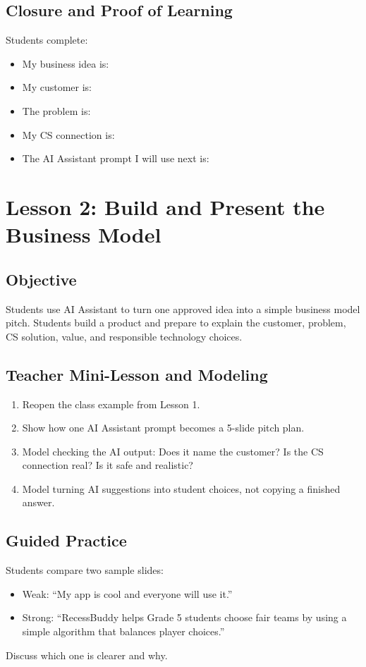 \documentclass[11pt]{article}
\begin{document}
\subsection{Closure and Proof of Learning}
Students complete:
\begin{itemize}
  \item My business idea is:
  \item My customer is:
  \item The problem is:
  \item My CS connection is:
  \item The AI Assistant prompt I will use next is:
\end{itemize}

\section{Lesson 2: Build and Present the Business Model}
\subsection{Objective}
Students use AI Assistant to turn one approved idea into a simple business model pitch. Students build a product and prepare to explain the customer, problem, CS solution, value, and responsible technology choices.

\subsection{Teacher Mini-Lesson and Modeling}
\begin{enumerate}
  \item Reopen the class example from Lesson 1.
  \item Show how one AI Assistant prompt becomes a 5-slide pitch plan.
  \item Model checking the AI output: Does it name the customer? Is the CS connection real? Is it safe and realistic?
  \item Model turning AI suggestions into student choices, not copying a finished answer.
\end{enumerate}

\subsection{Guided Practice}
Students compare two sample slides:
\begin{itemize}
  \item Weak: ``My app is cool and everyone will use it.''
  \item Strong: ``RecessBuddy helps Grade 5 students choose fair teams by using a simple algorithm that balances player choices.''
\end{itemize}
Discuss which one is clearer and why.
\end{document}
